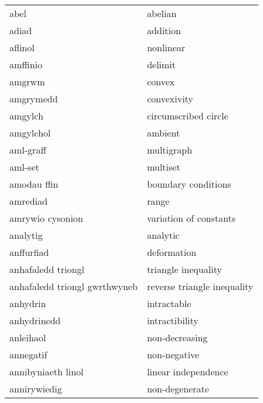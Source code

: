 \begin{supertabular}{p{0.22\textwidth}p{0.22\textwidth}}
                           abel &                          abelian \\
                          adiad &                         addition \\
                        aflinol &                        nonlinear \\
                       amffinio &                          delimit \\
                         amgrwm &                           convex \\
                      amgrymedd &                      convexivity \\
                        amgylch &             circumscribed circle \\
                      amgylchol &                          ambient \\
                      aml-graff &                       multigraph \\
                        aml-set &                         multiset \\
                    amodau ffin &              boundary conditions \\
                       amrediad &                            range \\
               amrywio cysonion &           variation of constants \\
                       analytig &                         analytic \\
                     anffurfiad &                      deformation \\
             anhafaledd triongl &              triangle inequality \\
  anhafaledd triongl gwrthwyneb &      reverse triangle inequality \\
                       anhydrin &                      intractable \\
                    anhydrinedd &                   intractibility \\
                      anleihaol &                   non-decreasing \\
                      annegatif &                     non-negative \\
             annibyniaeth linol &              linear independence \\
                   annirywiedig &                   non-degenerate \\

\end{supertabular}
